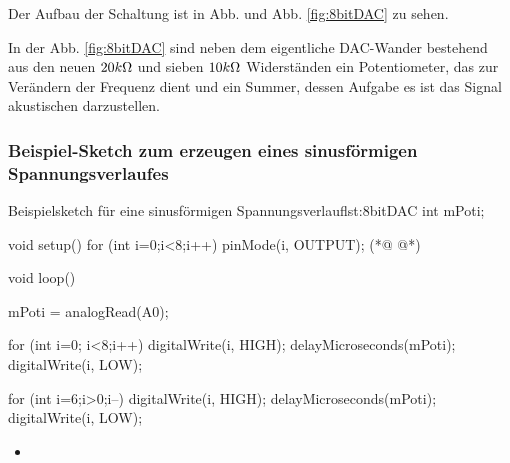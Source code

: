 Der Aufbau der Schaltung ist in Abb. und Abb. \ref{fig:8bitDAC} zu sehen. 

In der Abb. \ref{fig:8bitDAC} sind neben dem eigentliche DAC-Wander bestehend aus den neuen $20k\Omega$ und  sieben $10k\Omega$ Widerständen ein Potentiometer, das  zur Verändern der Frequenz dient und ein Summer, dessen Aufgabe es ist das Signal akustischen darzustellen.   
  

\clearpage
\subsubsection{Beispiel-Sketch zum erzeugen eines sinusförmigen Spannungsverlaufes}

\begin{multicols}{2}
\begin{arduinoCode}{Beispielsketch für eine sinusförmigen Spannungsverlauf}{lst:8bitDAC}
int mPoti;

void setup()
{
  for (int i=0;i<8;i++) {
    pinMode(i, OUTPUT); (*@  @*)
  }
}

void loop() {
    mPoti = analogRead(A0);
    
    for (int i=0; i<8;i++) {
      digitalWrite(i, HIGH); 
      delayMicroseconds(mPoti);
      digitalWrite(i, LOW);
    }
 
    for (int i=6;i>0;i--) {
      digitalWrite(i, HIGH);
      delayMicroseconds(mPoti);
      digitalWrite(i, LOW);
    }  
}\end{arduinoCode}

\vfill
\columnbreak

\begin{itemize}
  \itemsep15pt
  \item[] 
\end{itemize}


\vfill 
\end{multicols}



